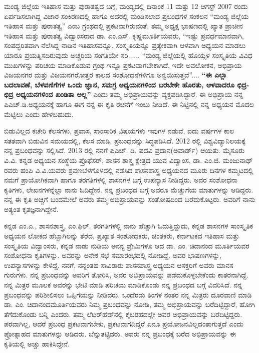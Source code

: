 ಮಂಡ್ಯ ಜಿಲ್ಲೆಯ ಇತಿಹಾಸ ಮತ್ತು ಪುರಾತತ್ವದ ಬಗ್ಗೆ, ಮಂಡ್ಯದಲ್ಲಿ ದಿನಾಂಕ 11 ಮತ್ತು 12 ಆಗಸ್ಟ್​ 2007 ರಂದು ಏರ್ಪಡಿಸಲಾಗಿದ್ದ ವಿಚಾರ ಸಂಕಿರಣದಲ್ಲಿ ಹಾಗೂ ಅದರಲ್ಲಿ ಮಂಡಿಸಲಾದ ಪ್ರಬಂಧಗಳ ಸಂಕಲನ “ಮಂಡ್ಯ ಜಿಲ್ಲೆಯ ಇತಿಹಾಸ ಮತ್ತು ಪುರಾತತ್ವ” ಎಂಬ ಗ್ರಂಥದಲ್ಲಿ ಪ್ರಕಟವಾಗಿರುವಂತೆ, ತಮ್ಮ ಅಧ್ಯಕ್ಷ ಭಾಷಣದಲ್ಲಿ ಖ್ಯಾತ ಪ್ರಾಚೀನ ಇತಿಹಾಸ ಮತ್ತು ಪುರಾತತ್ವ ವಿದ್ವಾಂಸರಾದ ಡಾ. ಎಂ.ಎಸ್​. ಕೃಷ್ಣಮೂರ್ತಿಯವರು, “ಇಷ್ಟು ಪ್ರವರ್ಧಮಾನವಾಗಿ, ಸಂಪದ್ಭರಿತವಾಗಿ ನೆಲೆಸಿದ್ದ ನಾಡಿನ ಇತಿಹಾಸವನ್ನೂ, ಸಂಸ್ಕೃತಿಯನ್ನೂ ಪ್ರತ್ಯೇಕವಾಗಿ ಆಳವಾಗಿ ಅಧ್ಯಯನ ಮಾಡಲು ಯಾರೂ ಪ್ರಯತ್ನಿಸದಿರುವುದು ಅಚ್ಚರಿಯ ಸಂಗತಿಯೇ ಸರಿ...... “ಮಂಡ್ಯ ಜಿಲ್ಲೆಯಲ್ಲಿ ಹೊಯ್ಸಳ ಸಂಸ್ಕೃತಿಯ ವಿವಿಧ ಮುಖ\-ಗಳನ್ನು ಪರಿಚಯ ಮಾಡಿಕೊಡುವ ಗ್ರಂಥ ಇನ್ನೂ ಪ್ರಕಟವಾಗಬೇಕಾಗಿದೆ, ಇದೇ ಅವಲೋಕನ, ಅಭಿಪ್ರಾಯ ವಿಜಯನಗರ ಮತ್ತು ವಿಜಯನಗರೋತ್ತರ ಕಾಲದ ಸಂಶೋಧನೆಗಳಿಗೂ ಅನ್ವಯಿಸುತ್ತದೆ”.... \textbf{“ಈ ಎಲ್ಲಾ ಬದಲಾವಣೆ, ಬೆಳವಣಿಗೆಗಳ ಒಂದು ಜ್ಞಾನ, ಸಮಗ್ರ ಅಧ್ಯಯನಗಳಿಂದ ಬರಬೇಕೇ ಹೊರತು, ಆಳವಾದರೂ ಛಿದ್ರ-ಛಿದ್ರ ಅಧ್ಯಯನಗಳಿಂದ ಖಂಡಿತಾ ಅಲ್ಲ”} ಎಂದು ತಮ್ಮ ಅಭಿಪ್ರಾಯವನ್ನು ವ್ಯಕ್ತಪಡಿಸಿದ್ದಾರೆ. ಈ ಅಭಿಪ್ರಾಯ ನನ್ನ ಪಿಎಚ್​.ಡಿ.ಅಧ್ಯಯನಕ್ಕೆ ಹಾಗೂ ಈಗ ನನ್ನ ಈ ಕೃತಿ ರಚನೆಗೆ ಇಂಬು ನೀಡಿದೆ. ಈ ನಿಟ್ಟಿನಲ್ಲಿ ನನ್ನ ಅಧ್ಯಯನ ಮೊದಲ ಮೆಟ್ಟಿಲು ಎಂದು ಹೇಳಬಹುದು.

ಬಿಡುವಿಲ್ಲದ ಕಚೇರಿ ಕೆಲಸಗಳು, ಪ್ರವಾಸ, ಸಾಂಸಾರಿಕ ವಿಷಯಗಳು ಇವುಗಳ ನಡುವೆ, ಐದು ವರ್ಷಗಳ ಕಾಲ ಸತತವಾಗಿ ಬಿಡುವಿನ ಸಮಯದಲ್ಲಿ, ಕೆಲಸ ಮಾಡಿ, ಪ್ರಬಂಧವನ್ನು ಸಿದ್ಧಪಡಿಸಿದೆ. 2012 ರಲ್ಲಿ ವಿಶ್ವವಿದ್ಯಾನಿಲಯಕ್ಕೆ ನನ್ನ ಪ್ರಬಂಧವನ್ನು ಸಲ್ಲಿಸಿದೆ. 2013 ರಲ್ಲಿ ನನಗೆ ಪಿಎಚ್. ಡಿ. ಪದವಿ ಪ್ರದಾನ(ಅವಾರ್ಡ್) ಆಯಿತು. ಮೈಸೂರು ವಿ.ವಿ. ಕನ್ನಡ ಅಧ್ಯಯನ ಸಂಸ್ಥೆಯ ಪ್ರೊಫೆಸರ್​, ಶಾಸನ ಶಾಸ್ತ್ರ ಕ್ಷೇತ್ರದ ಯುವ ವಿದ್ವಾಂಸ, ಡಾ. ಎಂ.ಜಿ. ಮಂಜುನಾಥ್​ರವರು ಹಂಪಿ ವಿ.ವಿ.ಯವರು ಶ್ರವಣಬೆಳಗೊಳದಲ್ಲಿ ನಡೆಸಿದ ಶಾಸನಶಾಸ್ತ್ರ ಅಧ್ಯಯನದ ಮೂರು ದಿನಗಳ ಕಮ್ಮಟದಲ್ಲಿ ನಮಗೆ ಪ್ರಾಯೋಗಿಕವಾಗಿ ಹಾಗೂ ತರಗತಿಗಳಲ್ಲಿ ಶಾಸನಗಳ ಬಗ್ಗೆ ಉಪನ್ಯಾಸ ನೀಡಿದ್ದರು. ಅವರ ಸಂಶೋಧನಾ ಕೃತಿಗಳು, ಲೇಖನಗಳನ್ನೆಲ್ಲಾ ನಾನು ಓದಿದ್ದೇನೆ. ನನ್ನ ಪ್ರಬಂಧದ ಬಗ್ಗೆ ಅವರೂ ಮೆಚ್ಚುಗೆಯ ಮಾತುಗಳನ್ನು ಆಡಿದ್ದರು. ನನ್ನ ಈ ಕೃತಿ ಅಚ್ಚಿಗೆ ಬಂದಮೇಲೆ ಅವರು ತಮ್ಮ ಅಭಿಪ್ರಾಯವನ್ನು ಸಂತೋಷದಿಂದ ಬರೆದುಕೊಟ್ಟರು. ಅವರಿಗೆ ನಾನು ಅತ್ಯಂತ ಕೃತಜ್ಞನಾಗಿದ್ದೇನೆ.

ಕನ್ನಡ ಎಂ.ಎ., ಶಾಸನಶಾಸ್ತ್ರ, ಎಂ.ಫಿಲ್​. ತರಗತಿಗಳಲ್ಲಿ ನಾನು ಹೆಚ್ಚಾಗಿ ಓದುತ್ತಿದ್ದುದು, ಕನ್ನಡ ಶಾಸನಗಳ ಸಾಂಸ್ಕೃತಿಕ ಅಧ್ಯಯನ ಲೋಕದ ಹೆಬ್ಬಾಗಿಲನ್ನು ತೆರೆದ, ಪ್ರಖ್ಯಾತ ಸಂಶೋಧಕರು, ಚಿಂತಕರು, ಕರ್ನಾಟಕದ ಇತಿಹಾಸ ಮತ್ತು ಸಂಸ್ಕೃತಿಯ ವಿದ್ವಾಂಸರು, ಕನ್ನಡ ನಾಡು ನುಡಿಯ ಅನನ್ಯ ಪ್ರೇಮಿಗಳೂ ಆದ ಡಾ. ಎಂ. ಚಿದಾನಂದ ಮೂರ್ತಿಯವರ ಸಂಶೋಧನಾ ಕೃತಿಗಳನ್ನು. ಅವರನ್ನು ಅನೇಕ ಸಭೆ ಸಮಾರಂಭದಲ್ಲಿ ನೋಡಿದ್ದೆ. ಅವರ ಭಾಷಣಗಳನ್ನು, ಉಪನ್ಯಾಸಗಳನ್ನು ಕೇಳಿದ್ದೆ. ನನಗೆ, ನನ್ನಂತಹ ಸಾವಿರಾರು ಶಾಸನಶಾಸ್ತ್ರ ಅಧ್ಯಯನ ಆಸಕ್ತರಿಗೆ ಅವರು ಮಾನಸ ಗುರುಗಳು. ನನ್ನ ಪ್ರಬಂಧವನ್ನು ಅವರಿಗೆ ತೋರಿಸಿ, ಅವರ ಅಭಿಪ್ರಾಯವನ್ನು ಪಡೆದುಕೊಳ್ಳಬೇಕೆಂದು ಕಾತರನಾಗಿದ್ದೆ. ನನ್ನ ಮಿತ್ರರ ಮೂಲಕ ಅವರನ್ನು ಭೇಟಿ ಮಾಡಿ ಪರಿಚಯ ಮಾಡಿಕೊಂಡು ನನ್ನ ಪ್ರಬಂಧದ ಬಗ್ಗೆ ವಿವರಿಸಿದೆ. ನನ್ನ ಪ್ರಬಂಧವನ್ನು ಪರಿಶೀಲಿಸಲು ಒಪ್ಪಿಗೆಯನ್ನು ನೀಡಿದರು. ಒಂದೆರಡು ತಿಂಗಳ ನಂತರ ನನ್ನ ಮಿತ್ರರು ದೂರವಾಣಿ ಮಾಡಿ ಡಾ. ಎಂ. ಚಿದಾನಂದಮೂರ್ತಿಯವರು ನಿಮ್ಮ ಪ್ರಬಂಧವನ್ನು ನೋಡಿ, ತಮ್ಮ ಅಭಿಪ್ರಾಯವನ್ನು ಬರೆದಿಟ್ಟಿದ್ದಾರೆ, ಹೋಗಿ ತೆಗೆದುಕೊಂಡು ಬನ್ನಿ ಎಂದರು. ತಮ್ಮ ಲೆಟರ್​ಹೆಡ್​ನಲ್ಲಿ ಕೈಬರಹದಲ್ಲೇ ಅವರ ಅಭಿಪ್ರಾಯವನ್ನು ಬರೆದಿಟ್ಟಿದ್ದರು. ಪರವಾಗಿಲ್ಲ, ಆದರೆ ಪ್ರಬಂಧ ಪ್ರಕಟವಾಗಬೇಕು, ಪ್ರಕಟವಾಗದಿದ್ದರೆ ಏನೂ ಪ್ರಯೋಜನವಿಲ್ಲದಂತಾಗುತ್ತದೆ ಎಂದು ಪ್ರೋತ್ಸಾಹದ ಮಾತುಗಳನ್ನು ಆಡಿದರು. ಬೆನ್ನುತಟ್ಟಿದರು. ಅವರು ನನ್ನ ಪ್ರಬಂಧಕ್ಕೆ ಬರೆದ ಅಭಿಪ್ರಾಯವನ್ನು ಈ ಕೃತಿಯಲ್ಲಿ ಅಚ್ಚು ಹಾಕಿಸಿದ್ದೇನೆ.

